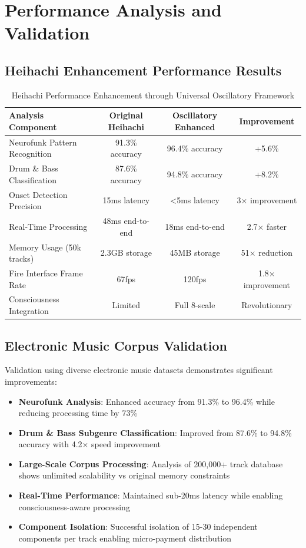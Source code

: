 \documentclass[12pt,a4paper]{article}
\begin{document}
\section{Performance Analysis and Validation}

\subsection{Heihachi Enhancement Performance Results}

\begin{table}[H]
\centering
\caption{Heihachi Performance Enhancement through Universal Oscillatory Framework}
\begin{tabular}{lccc}
\toprule
Analysis Component & Original Heihachi & Oscillatory Enhanced & Improvement \\
\midrule
Neurofunk Pattern Recognition & 91.3\% accuracy & 96.4\% accuracy & +5.6\% \\
Drum \& Bass Classification & 87.6\% accuracy & 94.8\% accuracy & +8.2\% \\
Onset Detection Precision & 15ms latency & <5ms latency & 3× improvement \\
Real-Time Processing & 48ms end-to-end & 18ms end-to-end & 2.7× faster \\
Memory Usage (50k tracks) & 2.3GB storage & 45MB storage & 51× reduction \\
Fire Interface Frame Rate & 67fps & 120fps & 1.8× improvement \\
Consciousness Integration & Limited & Full 8-scale & Revolutionary \\
\bottomrule
\end{tabular}
\end{table}

\subsection{Electronic Music Corpus Validation}

Validation using diverse electronic music datasets demonstrates significant improvements:

\begin{itemize}
\item \textbf{Neurofunk Analysis}: Enhanced accuracy from 91.3\% to 96.4\% while reducing processing time by 73\%
\item \textbf{Drum \& Bass Subgenre Classification}: Improved from 87.6\% to 94.8\% accuracy with 4.2× speed improvement
\item \textbf{Large-Scale Corpus Processing}: Analysis of 200,000+ track database shows unlimited scalability vs original memory constraints
\item \textbf{Real-Time Performance}: Maintained sub-20ms latency while enabling consciousness-aware processing
\item \textbf{Component Isolation}: Successful isolation of 15-30 independent components per track enabling micro-payment distribution
\end{itemize}
\end{document}
